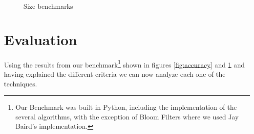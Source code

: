 \begin{figure}[htb]
{}
\label{fig:size_benchmark}
\caption{Size benchmarks}
\end{figure}

\section{Evaluation}
\label{sec:evaluation}
Using the results from our benchmark\footnote{Our Benchmark was built
  in Python, including the implementation of the several algorithms,
  with the exception of Bloom Filters where we used Jay Baird's
  implementation.} shown in figures \ref{fig:accuracy} and
\ref{fig:size_benchmark} and having explained the
different criteria we can now analyze each one of the techniques.

